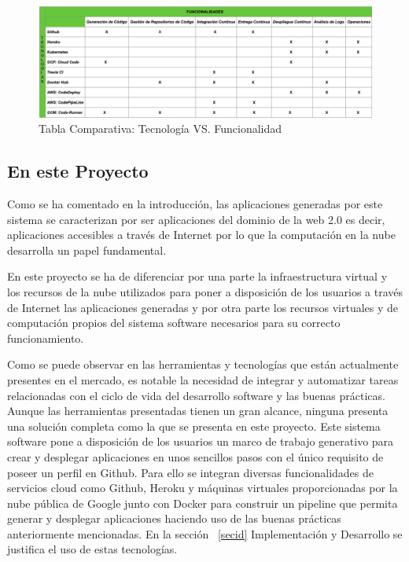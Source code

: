 \documentclass[a4paper,11pt]{book}
\begin{document}
\begin{figure}[H]
\centering
\includegraphics[scale=0.35]{imagenes/comparativa.png}
\caption{ Tabla Comparativa: Tecnología VS. Funcionalidad }
\label{comp}
\end{figure}


\subsection{En este Proyecto}

Como se ha comentado en la introducción, las aplicaciones generadas por este sistema se caracterizan por ser aplicaciones del dominio de la web 2.0 es decir, aplicaciones accesibles a través de Internet por lo que la computación en la nube desarrolla un papel fundamental. 

En este proyecto se ha de diferenciar por una parte la infraestructura virtual y los recursos de la nube utilizados para poner a disposición de los usuarios  a través de Internet las aplicaciones generadas y por otra parte los recursos virtuales y de computación propios del sistema software necesarios para su correcto funcionamiento. 

Como se puede observar en las herramientas y tecnologías que están actualmente presentes en el mercado, es notable la necesidad de integrar y automatizar tareas relacionadas con el ciclo de vida del desarrollo software y las buenas prácticas. Aunque las herramientas presentadas tienen un gran alcance, ninguna presenta una solución completa como la que se presenta en este proyecto. Este sistema software pone a disposición de los usuarios un marco de trabajo generativo para crear y desplegar aplicaciones en unos sencillos pasos con el único requisito de poseer un perfil en Github. Para ello se integran diversas funcionalidades de servicios cloud como Github, Heroku y máquinas virtuales proporcionadas por la nube pública de Google  junto con Docker para construir un pipeline que permita generar y desplegar aplicaciones haciendo uso de las buenas prácticas anteriormente mencionadas. En la sección ~\ref{secid} Implementación y Desarrollo se justifica el uso de estas tecnologías. 
\end{document}
